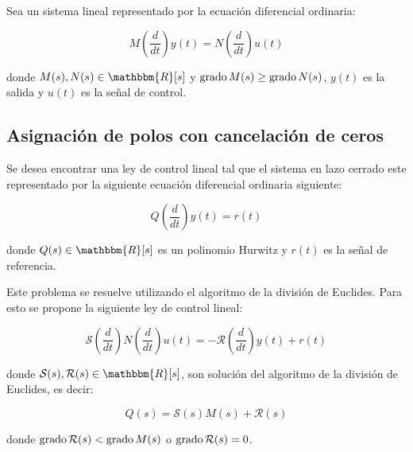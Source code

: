         Sea un sistema lineal representado por la ecuación diferencial ordinaria:

        \begin{equation} \label{eq:anillos1}
            M \left( \frac{d}{dt} \right) y(t) = N \left( \frac{d}{dt} \right) u(t)
        \end{equation}

        donde $M(s), N(s) \in \mathbbm{R}[s]$ y $\operatorname{grado}{M(s)} \ge \operatorname{grado}{N(s)}$, $y(t)$ es la salida y $u(t)$ es la señal de control.


        \subsection{Asignación de polos con cancelación de ceros}

            Se desea encontrar una ley de control lineal tal que el sistema en lazo cerrado este representado por la siguiente ecuación diferencial ordinaria siguiente:

            \begin{equation}
                Q \left( \frac{d}{dt} \right) y(t) = r(t)
            \end{equation}

            donde $Q(s) \in \mathbbm{R}[s]$ es un polinomio Hurwitz y $r(t)$ es la señal de referencia.

            Este problema se resuelve utilizando el algoritmo de la división de Euclides. Para esto se propone la siguiente ley de control lineal:

            \begin{equation} \label{eq:anillos2}
                \mathcal{S} \left( \frac{d}{dt} \right) N \left( \frac{d}{dt} \right) u(t) = - \mathcal{R} \left( \frac{d}{dt} \right) y(t) + r(t)
            \end{equation}

            donde $\mathcal{S}(s), \mathcal{R}(s) \in \mathbbm{R}[s]$, son solución del algoritmo de la división de Euclides, es decir:

            \begin{equation} \label{eq:anillos3}
                Q(s) = \mathcal{S}(s) M(s) + \mathcal{R}(s)
            \end{equation}

            donde $\operatorname{grado}{\mathcal{R}(s)} < \operatorname{grado}{M(s)}$ o $\operatorname{grado}{\mathcal{R}(s)} = 0$.

